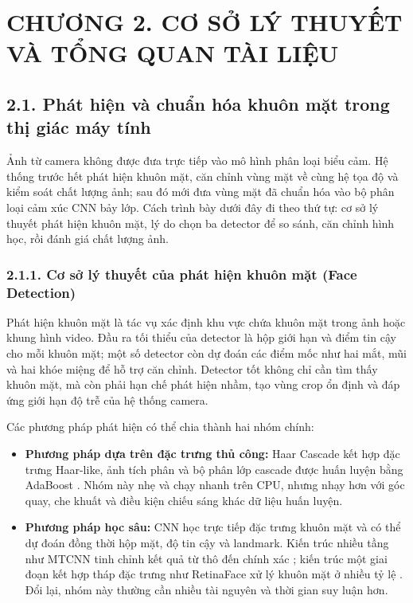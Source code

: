\section*{CHƯƠNG 2. CƠ SỞ LÝ THUYẾT VÀ TỔNG QUAN TÀI LIỆU}
\setcounter{section}{2}
\setcounter{subsection}{0}
\setcounter{figure}{0}
\setcounter{table}{0}

\subsection*{2.1. Phát hiện và chuẩn hóa khuôn mặt trong thị giác máy tính}

Ảnh từ camera không được đưa trực tiếp vào mô hình phân loại biểu cảm. Hệ thống trước hết phát hiện khuôn mặt, căn chỉnh vùng mặt về cùng hệ tọa độ và kiểm soát chất lượng ảnh; sau đó mới đưa vùng mặt đã chuẩn hóa vào bộ phân loại cảm xúc CNN bảy lớp. Cách trình bày dưới đây đi theo thứ tự: cơ sở lý thuyết phát hiện khuôn mặt, lý do chọn ba detector để so sánh, căn chỉnh hình học, rồi đánh giá chất lượng ảnh.

\subsubsection*{2.1.1. Cơ sở lý thuyết của phát hiện khuôn mặt (Face Detection)}

Phát hiện khuôn mặt là tác vụ xác định khu vực chứa khuôn mặt trong ảnh hoặc khung hình video. Đầu ra tối thiểu của detector là hộp giới hạn và điểm tin cậy cho mỗi khuôn mặt; một số detector còn dự đoán các điểm mốc như hai mắt, mũi và hai khóe miệng để hỗ trợ căn chỉnh. Detector tốt không chỉ cần tìm thấy khuôn mặt, mà còn phải hạn chế phát hiện nhầm, tạo vùng crop ổn định và đáp ứng giới hạn độ trễ của hệ thống camera.

Các phương pháp phát hiện có thể chia thành hai nhóm chính:
\begin{itemize}
    \item \textbf{Phương pháp dựa trên đặc trưng thủ công:} Haar Cascade kết hợp đặc trưng Haar-like, ảnh tích phân và bộ phân lớp cascade được huấn luyện bằng AdaBoost \cite{viola2001rapid}. Nhóm này nhẹ và chạy nhanh trên CPU, nhưng nhạy hơn với góc quay, che khuất và điều kiện chiếu sáng khác dữ liệu huấn luyện.
    \item \textbf{Phương pháp học sâu:} CNN học trực tiếp đặc trưng khuôn mặt và có thể dự đoán đồng thời hộp mặt, độ tin cậy và landmark. Kiến trúc nhiều tầng như MTCNN tinh chỉnh kết quả từ thô đến chính xác \cite{zhang2016mtcnn}; kiến trúc một giai đoạn kết hợp tháp đặc trưng như RetinaFace xử lý khuôn mặt ở nhiều tỷ lệ \cite{retinaface}. Đổi lại, nhóm này thường cần nhiều tài nguyên và thời gian suy luận hơn.
\end{itemize}

